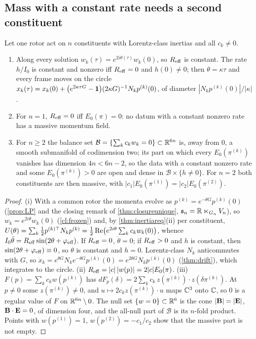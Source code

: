 \subsection{Mass with a constant rate needs a second constituent}
\label{d6:sec:balance}

\begin{theorem}
\label{d6:thm:balance}
Let one rotor act on $n$ constituents with Lorentz-class inertias and all $c_k\neq0$.
\begin{enumerate}[label=(\roman*),leftmargin=2.2em]
\item Along every solution $w_k(\tau)=e^{2i\theta(\tau)}w_k(0)$, so $R_{\rm eff}$ is constant. The rate $h/I_0$ is constant and nonzero iff
$R_{\rm eff}=0$ and $h(0)\neq0$; then $\theta=\kappa\tau$ and every frame moves on the circle
$x_k(\tau)=x_k(0)+\bigl(e^{2\kappa\tau G}-\mathbf 1\bigr)(2\kappa G)^{-1}N_kp^{(k)}(0)$, of diameter $|N_kp^{(k)}(0)|/|\kappa|$.
\item For $n=1$, $R_{\rm eff}=0$ iff $E_0(\pi)=0$: no datum with a constant nonzero rate has a massive momentum field.
\item For $n\ge2$ the balance set $\mathcal B=\{\sum_kc_kw_k=0\}\subset\mathbb{R}^{6n}$ is, away from $0$, a smooth submanifold of codimension two; its
part on which every $E_0(\pi^{(k)})$ vanishes has dimension $4n<6n-2$, so the data with a constant nonzero rate and some $E_0(\pi^{(k)})>0$ are
open and dense in $\mathcal B\times\{h\neq0\}$. For $n=2$ both constituents are then massive, with $|c_1|E_0(\pi^{(1)})=|c_2|E_0(\pi^{(2)})$.
\end{enumerate}
\end{theorem}

\begin{proof}
(i) With a common rotor the momenta evolve as $p^{(k)}=e^{-\theta G}p^{(k)}(0)$ (\cref{prop:LP} and the closing remark of \cref{thm:closureunique}, $\mathfrak s_n=\mathbb{R}\ltimes_{G_n}V_n$), so $w_k=e^{2i\theta}w_k(0)$ (\cref{cl:frozen}) and, by \cref{thm:inertiareq}(ii) per
constituent, $U(\theta)=\sum_k\tfrac12 p^{(k)\top}N_kp^{(k)}=\tfrac12\operatorname{Re}\bigl(e^{2i\theta}\sum_kc_kw_k(0)\bigr)$, whence
$I_0\ddot\theta=R_{\rm eff}\sin(2\theta+\varphi_{\rm eff})$. If $R_{\rm eff}=0$, $\ddot\theta=0$; if $R_{\rm eff}>0$ and $h$ is constant, then
$\sin(2\theta+\varphi_{\rm eff})\equiv0$, so $\theta$ is constant and $h=0$. Lorentz-class $N_k$ anticommutes with $G$, so
$\dot x_k=e^{\theta G}N_ke^{-\theta G}p^{(k)}(0)=e^{2\theta G}N_kp^{(k)}(0)$ (\cref{thm:drift}), which integrates to the circle.
(ii) $R_{\rm eff}=|c|\,|w(p)|=2|c|E_0(\pi)$. (iii) $F(p)=\sum_kc_kw(p^{(k)})$ has $dF_p(\delta)=2\sum_kc_k\,z(\pi^{(k)})\cdot z(\delta\pi^{(k)})$. At
$p\neq0$ some $z(\pi^{(k)})\neq0$, and $u\mapsto2c_kz(\pi^{(k)})\cdot u$ maps $\mathbb{C}^3$ onto $\mathbb{C}$, so $0$ is a regular value of $F$ on
$\mathbb{R}^{6n}\setminus0$. The null set $\{w=0\}\subset\mathbb{R}^6$ is the cone $|\mathbf B|=|\mathbf E|$, $\mathbf B\cdot\mathbf E=0$, of dimension four, and the all-null part of
$\mathcal B$ is its $n$-fold product. Points with $w(p^{(1)})=1$, $w(p^{(2)})=-c_1/c_2$ show that the massive part is not empty.
\end{proof}

